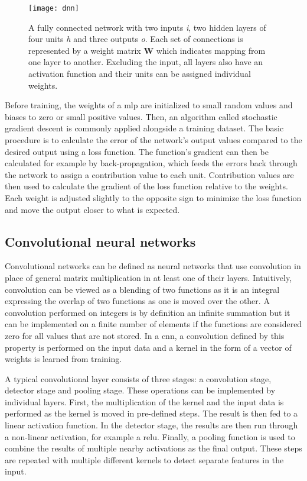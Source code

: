 \begin{figure}[H]
\centering
\texttt{[image: dnn]}
\caption{A fully connected network with two inputs \textit{i}, two hidden layers of four units \textit{h} and three outputs \textit{o}. Each set of connections is represented by a weight matrix \textbf{W} which indicates mapping from one layer to another. Excluding the input, all layers also have an activation function and their units can be assigned individual weights.}\label{fig:fcon}
\end{figure}

Before training, the weights of a \ac{mlp} are initialized to small random values and biases to zero or small positive values. Then, an algorithm called stochastic gradient descent is commonly applied alongside a training dataset. The basic procedure is to calculate the error of the network's output values compared to the desired output using a loss function. The function's gradient can then be calculated for example by back-propagation, which feeds the errors back through the network to assign a contribution value to each unit. Contribution values are then used to calculate the gradient of the loss function relative to the weights. Each weight is adjusted slightly to the opposite sign to minimize the loss function and move the output closer to what is expected.

\subsection{Convolutional neural networks}\label{ssec:dlcnn}
Convolutional networks can be defined as neural networks that use convolution in place of general matrix multiplication in at least one of their layers. Intuitively, convolution can be viewed as a blending of two functions as it is an integral expressing the overlap of two functions as one is moved over the other. A convolution performed on integers is by definition an infinite summation but it can be implemented on a finite number of elements if the functions are considered zero for all values that are not stored. In a \ac{cnn}, a convolution defined by this property is performed on the input data and a kernel in the form of a vector of weights is learned from training.

A typical convolutional layer consists of three stages: a convolution stage, detector stage and pooling stage. These operations can be implemented by individual layers. First, the multiplication of the kernel and the input data is performed as the kernel is moved in pre-defined steps. The result is then fed to a linear activation function. In the detector stage, the results are then run through a non-linear activation, for example a \ac{relu}. Finally, a pooling function is used to combine the results of multiple nearby activations as the final output. These steps are repeated with multiple different kernels to detect separate features in the input.

